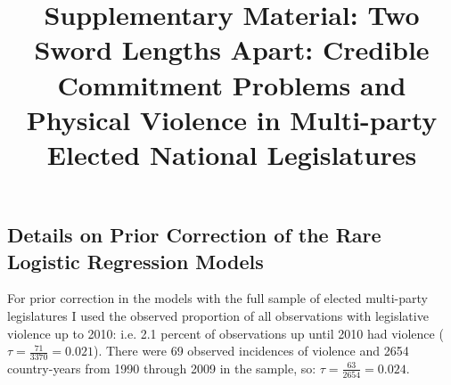 \documentclass[a4paper]{article}\usepackage[]{graphicx}\usepackage[]{color}
\title{Supplementary Material: Two Sword Lengths Apart: Credible Commitment Problems and Physical Violence in Multi-party Elected National Legislatures}
\begin{document}
\maketitle






\subsection*{Details on Prior Correction of the Rare Logistic Regression Models}

For prior correction \citep[see][]{KingRareEventsPA2001} in the models with the full sample of elected multi-party legislatures I used the observed proportion of all observations with legislative violence up to 2010: i.e. 2.1 percent of observations up until 2010 had violence ($\tau = \frac{71}{3370} = 0.021$). There were 69 observed incidences of violence and 2654 country-years from 1990 through 2009 in the sample, so: $\tau = \frac{63}{2654} = 0.024$.
\end{document}
